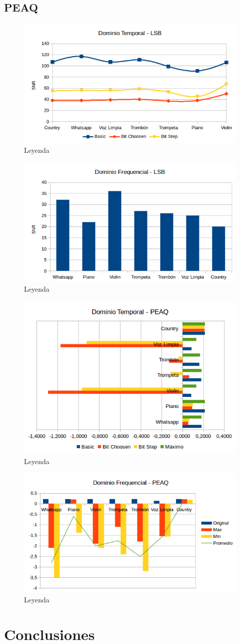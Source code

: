 \documentclass[conference,a4paper,10pt, oneside,final]{tfmpd}
\begin{document}
\subsection{PEAQ}
\begin{figure}[h!]
 \centering
 \includegraphics[keepaspectratio=true, width=240 px]{./graficos/dominio-temporal-lsb-snr.png}
 \caption{Leyenda}
 \label{fig: etiqueta}
\end{figure}

\begin{figure}[h!]
 \centering
 \includegraphics[keepaspectratio=true, width=240 px]{./graficos/dominio-frequencial-lsb-snr.png}
 \caption{Leyenda}
 \label{fig: Etiqueta}
\end{figure}

\begin{figure}[h!]
 \centering
 \includegraphics[keepaspectratio=true, width=240 px]{./graficos/dominio-temporal-lsb-peaq.png}
 \caption{Leyenda}
 \label{fig: Etiqueta}
\end{figure}

\begin{figure}[h!]
 \centering
 \includegraphics[keepaspectratio=true, width=240 px]{./graficos/dominio-frecuencial-wdt-peaq.png}
 \caption{Leyenda}
 \label{fig: Etiqueta}
\end{figure}


\section{Conclusiones}

\nocite{*}


\end{document}
